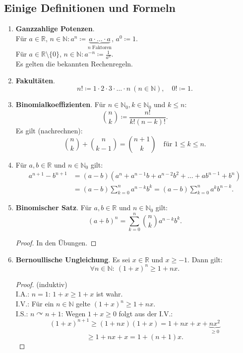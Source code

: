 \documentclass[12pt]{extreport} %
\newcommand{\N}{\mathbb{N}}
\newcommand{\R}{\mathbb{R}}
\theoremstyle{named}
\theoremstyle{itshape}
\theoremstyle{normal}
\begin{document}
\subsection*{Einige Definitionen und Formeln} 
\begin{enumerate}
	\item \textbf{Ganzzahlige Potenzen}.\\ Für $a \in \R$, $n \in \N: a^{n} \coloneqq \underbrace{a \cdot \dotsc \cdot a}_{n \text{ Faktoren}}$, $a^{0} \coloneqq 1$. \\ 
	        Für $a \in \R\setminus \{0\}$, $n \in \N: a^{-n} \coloneqq \frac{1}{a^{n}}$. \\
		Es gelten die bekannten Rechenregeln.
	\item \textbf{Fakultäten}. 
	        $$ n! \coloneqq 1 \cdot 2 \cdot 3 \cdot \dotsc \cdot n ~ (n \in \N), \quad 0! \coloneqq 1.$$
	\item \textbf{Binomialkoeffizienten}. Für $n \in \N_{0}, k \in \N_{0}$ und $k \leq n$:
		$$ \binom{n}{k} \coloneqq \frac{n!}{k!(n - k)!}. $$
		Es gilt (nachrechnen):
		$$ \binom{n}{k} + \binom{n}{k - 1} = \binom{n + 1}{k} \quad \text{für } 1 \leq k \leq n. $$
	\item Für $a, b \in \R$ und $n \in \N_0$ gilt: 
		\begin{align*}
			a^{n + 1} - b^{n + 1} & = (a - b) \left(a^{n} + a^{n-1}b + a^{n-2}b^{2} + \dotsc + a b^{n-1} + b^{n} \right) \\
				& = (a - b) \sum_{k = 0}^{n} a^{n -k}b^{k} = (a - b) \sum_{k = 0}^{n} a^{k}b^{n-k}.
		\end{align*}
	\item \textbf{Binomischer Satz}. Für $a, b \in \R$ und $n \in \N_0$ gilt: $$(a + b)^{n} = \sum_{k = 0}^{n} \binom{n}{k} a^{n-k}b^{k}.$$
		\begin{proof}
			In den Übungen.
		\end{proof}
	\item \textbf{Bernoullische Ungleichung}. Es sei $x \in \R$ und $x \geq -1$. Dann gilt:
		$$\forall n \in \N: ~  (1 + x)^{n} \geq 1 + n x.$$
		\begin{proof}(induktiv) \\
			I.A.: $n = 1$: $1 + x \geq 1 + x$ ist wahr.\\
			I.V.: Für ein $n \in \N$ gelte $(1 + x)^{n} \geq 1 + nx$. \\
			I.S.: $n \curvearrowright n + 1$: Wegen $1 + x \geq 0$ folgt aus der I.V.:
			$$
			(1 + x)^{n + 1}  \geq (1 + nx)(1 + x)  = 1 + nx + x + \underbrace{nx^{2}}_{\geq 0} 
			$$
			$$
			 \geq 1 + nx + x  = 1 + (n + 1)x.
			$$
		\end{proof}
\end{enumerate}
\end{document}
